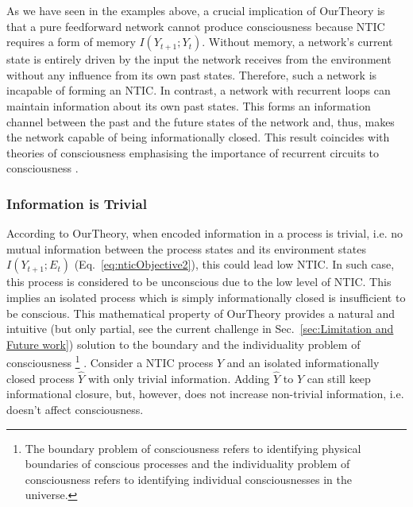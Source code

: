 \documentclass[utf8]{article}
\begin{document}
        		
        		As we have seen in the examples above, a crucial implication of \ac{OurTheory} is that a pure feedforward network cannot produce consciousness because NTIC requires a form of memory $I(Y_{t+1};Y_{t})$. Without memory, a network's current state is entirely driven by the input the network receives from the environment without any influence from its own past states. Therefore, such a network is incapable of forming an NTIC. In contrast, a network with recurrent loops can maintain information about its own past states. This forms an information channel between the past and the future states of the network and, thus, makes the network capable of being informationally closed. This result coincides with theories of consciousness emphasising the importance of recurrent circuits to consciousness \citep{lamme2006towards, edelman1992bright, tononi2008neural}.
        		


            \subsubsection*{Information is Trivial}
                According to \ac{OurTheory}, when encoded information in a process is trivial, i.e. no mutual information between the process states and its environment states $I(Y_{t+1};E_{t})$ (Eq.~\ref{eq:nticObjective2}), this could lead low NTIC. In such case, this process is considered to be unconscious due to the low level of NTIC. This implies an isolated process which is simply informationally closed is insufficient to be conscious. 
                This mathematical property of \ac{OurTheory} provides a natural and intuitive (but only partial, see the current challenge in  Sec.~\ref{sec:Limitation and Future work}) solution to the boundary and the individuality problem of consciousness
                    \footnote{The boundary problem of consciousness refers to identifying physical boundaries of conscious processes and the individuality problem of consciousness refers to identifying individual consciousnesses in the universe.}
                \citep{Raymont2006-RAYUOC}. Consider a NTIC process $Y$ and an isolated informationally closed process $\hat{Y}$ with only trivial information. Adding $\hat{Y}$ to $Y$ can still keep informational closure, but, however, does not increase non-trivial information, i.e. doesn't affect consciousness. 
                
\end{document}
